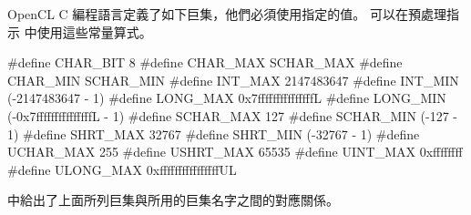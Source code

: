 {}

OpenCL C 編程語言定義了如下巨集，他們必須使用指定的值。
可以在預處理指示  中使用這些常量算式。

\startclc
#define CHAR_BIT	8
#define CHAR_MAX	SCHAR_MAX
#define CHAR_MIN	SCHAR_MIN
#define INT_MAX		2147483647
#define INT_MIN		(-2147483647 - 1)
#define LONG_MAX	0x7fffffffffffffffL
#define LONG_MIN	(-0x7fffffffffffffffL - 1)
#define SCHAR_MAX	127
#define SCHAR_MIN	(-127 - 1)
#define SHRT_MAX	32767
#define SHRT_MIN	(-32767 - 1)
#define UCHAR_MAX	255
#define USHRT_MAX	65535
#define UINT_MAX	0xffffffff
#define ULONG_MAX	0xffffffffffffffffUL
\stopclc

中給出了上面所列巨集與所用的巨集名字之間的對應關係。

{}
